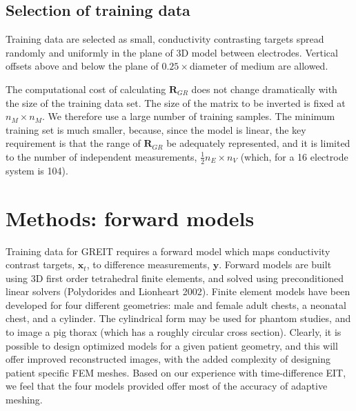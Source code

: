 \documentclass[12pt]{iopart}
\newcommand{\xB}{\mbox{$\mathbf{x}$}}
\newcommand{\yB}{\mbox{$\mathbf{y}$}}
\newcommand{\RB}{\mbox{$\mathbf{R}$}}
\begin{document}
\subsection{Selection of training data}
\label{subsec:training_data}

Training data are selected as small, conductivity contrasting
targets spread randomly and uniformly in the plane of 3D model
between electrodes. Vertical offsets above and below the
plane of $0.25\times$diameter of medium are allowed.

The computational cost of calculating $\RB_{GR}$ does
not change dramatically with the size of the training data
set. The size of the matrix to be inverted is fixed at
$n_M \times n_M$. We therefore use a large number of
training samples. The minimum training set 
is much smaller, because, since the model is
linear, the key requirement is that the range of 
$\RB_{GR}$ be adequately represented, and it is limited
to the number of independent measurements,
$\frac{1}{2} n_E \times n_V$ (which, for a 16 electrode
system is 104).

\section{Methods: forward models}

Training data for GREIT requires a forward model which
maps conductivity contrast targets, $\xB_t$, to difference
measurements, $\yB$. Forward models are built using
3D first order tetrahedral finite elements, and
solved using preconditioned linear solvers
(Polydorides and Lionheart 2002).
Finite element models have been developed for four
different geometries: 
male and female adult chests,
a neonatal chest, and
a cylinder. The cylindrical form may be used
for phantom studies, and to image a pig thorax
(which has a roughly circular cross section).
Clearly, it is possible to design optimized
models for a given patient geometry, and this
will offer improved reconstructed images,
with the added complexity of designing
patient specific FEM meshes.
Based on our experience with time-difference
EIT, we feel that the four models provided offer
most of the accuracy of adaptive meshing.
\end{document}
